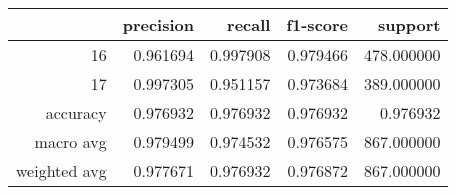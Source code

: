 \begin{tabular}{rrrrr}
\toprule
 & precision & recall & f1-score & support \\
\midrule
16 & 0.961694 & 0.997908 & 0.979466 & 478.000000 \\
17 & 0.997305 & 0.951157 & 0.973684 & 389.000000 \\
accuracy & 0.976932 & 0.976932 & 0.976932 & 0.976932 \\
macro avg & 0.979499 & 0.974532 & 0.976575 & 867.000000 \\
weighted avg & 0.977671 & 0.976932 & 0.976872 & 867.000000 \\
\bottomrule
\end{tabular}
